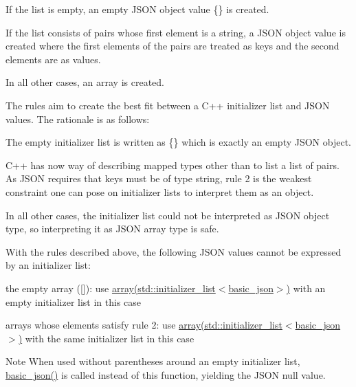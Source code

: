 \begin{DoxyEnumerate}
\item If the list is empty, an empty J\+S\+ON object value {\ttfamily \{\}} is created.
\item If the list consists of pairs whose first element is a string, a J\+S\+ON object value is created where the first elements of the pairs are treated as keys and the second elements are as values.
\item In all other cases, an array is created.
\end{DoxyEnumerate}

The rules aim to create the best fit between a C++ initializer list and J\+S\+ON values. The rationale is as follows\+:


\begin{DoxyEnumerate}
\item The empty initializer list is written as {\ttfamily \{\}} which is exactly an empty J\+S\+ON object.
\item C++ has now way of describing mapped types other than to list a list of pairs. As J\+S\+ON requires that keys must be of type string, rule 2 is the weakest constraint one can pose on initializer lists to interpret them as an object.
\item In all other cases, the initializer list could not be interpreted as J\+S\+ON object type, so interpreting it as J\+S\+ON array type is safe.
\end{DoxyEnumerate}

With the rules described above, the following J\+S\+ON values cannot be expressed by an initializer list\+:


\begin{DoxyItemize}
\item the empty array ({\ttfamily \mbox{[}\mbox{]}})\+: use \mbox{\hyperlink{classnlohmann_1_1basic__json_a4a4ec75e4d2845d9bcf7a9e5458e4949}{array(std\+::initializer\+\_\+list$<$basic\+\_\+json$>$)}} with an empty initializer list in this case
\item arrays whose elements satisfy rule 2\+: use \mbox{\hyperlink{classnlohmann_1_1basic__json_a4a4ec75e4d2845d9bcf7a9e5458e4949}{array(std\+::initializer\+\_\+list$<$basic\+\_\+json$>$)}} with the same initializer list in this case
\end{DoxyItemize}

\begin{DoxyNote}{Note}
When used without parentheses around an empty initializer list, \mbox{\hyperlink{classnlohmann_1_1basic__json_a32124a16dc80729d964d9caf607c2bc8}{basic\+\_\+json()}} is called instead of this function, yielding the J\+S\+ON null value.
\end{DoxyNote}

